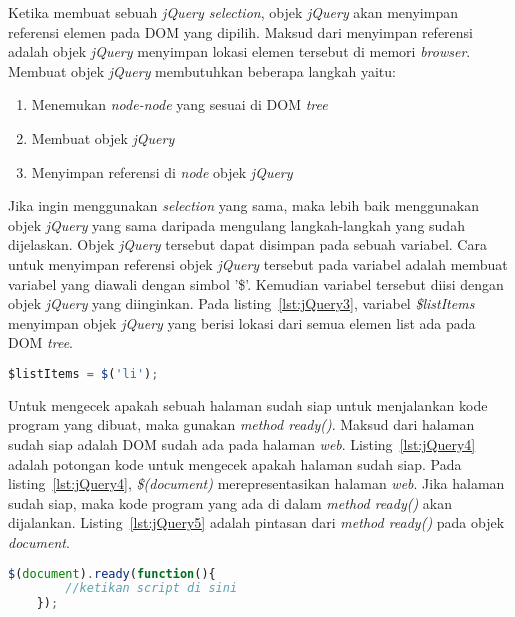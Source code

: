 Ketika membuat sebuah \textit{jQuery selection}, objek \textit{jQuery} akan menyimpan referensi elemen pada DOM yang dipilih. Maksud dari menyimpan referensi adalah objek \textit{jQuery} menyimpan lokasi elemen tersebut di memori \textit{browser}. Membuat objek \textit{jQuery} membutuhkan beberapa langkah yaitu: 

\begin{enumerate}
	\item Menemukan \textit{node-node} yang sesuai di DOM \textit{tree}
	\item Membuat objek \textit{jQuery}
	\item Menyimpan referensi di \textit{node} objek \textit{jQuery}
\end{enumerate}

Jika ingin menggunakan \textit{selection} yang sama, maka lebih baik menggunakan objek \textit{jQuery} yang sama daripada mengulang langkah-langkah yang sudah dijelaskan. Objek \textit{jQuery} tersebut dapat disimpan pada sebuah variabel. Cara untuk menyimpan referensi objek \textit{jQuery} tersebut pada variabel adalah membuat variabel yang diawali dengan simbol '\$'. Kemudian variabel tersebut diisi dengan objek \textit{jQuery} yang diinginkan. Pada listing~\ref{lst:jQuery3}, variabel \textit{\$listItems} menyimpan objek \textit{jQuery} yang berisi lokasi dari semua elemen list ada pada DOM \textit{tree}.

\begin{lstlisting}[language=Javascript, caption=Menyimpan objek jQuery , label={lst:jQuery3}]
	$listItems = $('li');
\end{lstlisting}

Untuk mengecek apakah sebuah halaman sudah siap untuk menjalankan kode program yang dibuat, maka gunakan \textit{method ready()}. Maksud dari halaman sudah siap adalah DOM sudah ada pada halaman \textit{web}. Listing~\ref{lst:jQuery4} adalah potongan kode untuk mengecek apakah halaman sudah siap. Pada listing~\ref{lst:jQuery4}, \textit{\$(document)} merepresentasikan halaman \textit{web}. Jika halaman sudah siap, maka kode program yang ada di dalam \textit{method ready()} akan dijalankan. Listing~\ref{lst:jQuery5} adalah pintasan dari \textit{method ready()} pada objek \textit{document}.

\begin{lstlisting}[language=Javascript, caption=Mengecek apakah halaman sudah siap , label={lst:jQuery4}]
	$(document).ready(function(){
		//ketikan script di sini
	});
\end{lstlisting}

